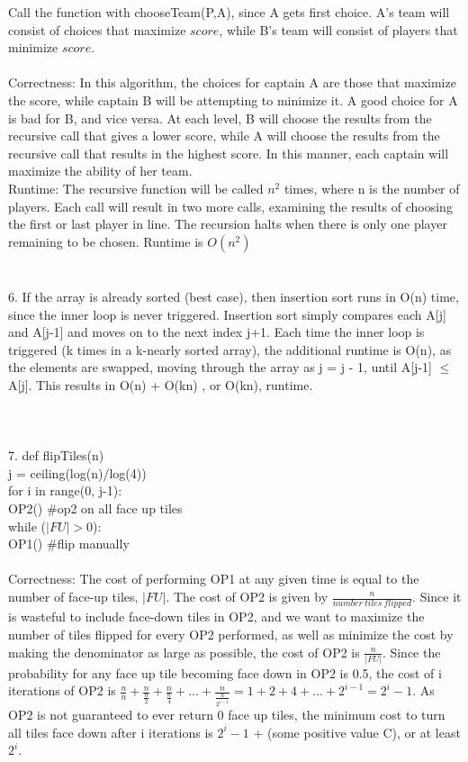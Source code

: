 \documentclass[11pt, oneside]{article}   	%
\begin{document}
Call the function with chooseTeam(P,A), since A gets first choice.  A's team will consist of choices that maximize $score$, while B's team will consist of players that minimize $score$.\\\\
Correctness: In this algorithm, the choices for captain A are those that maximize the score, while captain B will be attempting to minimize it.  A good choice for A is bad for B, and vice versa.  At each level, B will choose the results from the recursive call that gives a lower score, while A will choose the results from the recursive call that results in the highest score.  In this manner, each captain will maximize the ability of her team.\\
Runtime:  The recursive function will be called $n^2$ times, where n is the number of players.  Each call will result in two more calls, examining the results of choosing the first or last player in line.  The recursion halts when there is only one player remaining to be chosen. Runtime is $O(n^2)$\\\\\\
6.  If the array is already sorted (best case), then insertion sort runs in O(n) time, since the inner loop is never triggered.  Insertion sort simply compares each A[j] and A[j-1] and moves on to the next index j+1.  Each time the inner loop is triggered (k times in a k-nearly sorted array), the additional runtime is O(n), as the elements are swapped, moving through the array as j = j - 1, until A[j-1] $\leq$ A[j].  This results in O(n) + O(kn) , or O(kn), runtime.\\\\\\\\
7. def flipTiles(n)\\
\indent\indent j = ceiling(log(n)/log(4))\\
\indent\indent for i in range(0, j-1):\\
\indent\indent\indent OP2() \#op2 on all face up tiles\\
\indent\indent while ($|FU|>0$):\\
\indent\indent\indent OP1() \#flip manually\\\\
Correctness:  The cost of performing OP1 at any given time is equal to the number of face-up tiles, $|FU|$.  The cost of OP2 is given by $\frac{n}{number\ tiles\ flipped}$.  Since it is wasteful to include face-down tiles in OP2, and we want to maximize the number of tiles flipped for every OP2 performed, as well as minimize the cost by making the denominator as large as possible, the cost of OP2 is $\frac{n}{|FU|}$.  Since the probability for any face up tile becoming face down in OP2 is 0.5, the cost of i iterations of OP2 is $\frac{n}{n} + \frac{n}{\frac{n}{2}} +\frac{n}{\frac{n}{4}} +... + \frac{n}{\frac{n}{2^{i-1}}}=1+2+4+...+2^{i-1} =2^i-1$.  As OP2 is not guaranteed to ever return 0 face up tiles, the minimum cost to turn all tiles face down after i iterations is $2^i -1$ + (some positive value C), or at least $2^i$.\\
\end{document}
